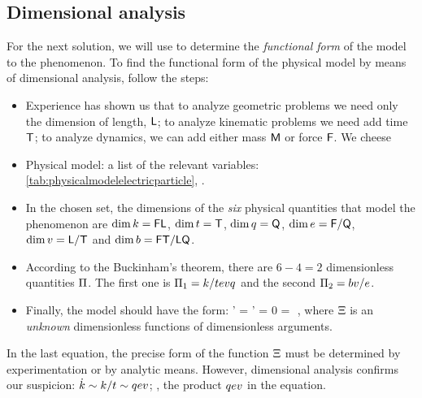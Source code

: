 \subsection{Dimensional analysis}\label{sec:dimanalysis}
%
For the next solution, we will use  to determine the \emph{functional form} of the model to the phenomenon. To find the functional form of the physical model by means of dimensional analysis, follow the steps:
%
\begin{itemize}
%
%
\item Experience has shown us that to analyze geometric problems we need only the dimension of length, $\mathsf{L}$; to analyze kinematic problems we need add time $\mathsf{T}$; to analyze dynamics, we can add either mass $\mathsf{M}$ or force $\mathsf{F}$. We cheese
%
\item Physical model: a list of the relevant variables: \vide \cref{tab:physicalmodelelectricparticle}, \cite[p. 4]{price:2006}.
%
~
%
\item In the chosen set, the dimensions of the \emph{six} physical quantities that model the phenomenon are $\dim k = \mathsf{FL}$, $\dim t = \mathsf{T}$, $\dim q = \mathsf{Q}$, $\dim e = \mathsf{F}/\mathsf{Q}$, $\dim v = \mathsf{L}/\mathsf{T}$ and $\dim b = \mathsf{F}\mathsf{T}/\mathsf{L}\mathsf{Q}$.
%
~
%
\item According to the Buckinham's theorem, there are $6 - 4 = 2$ dimensionless quantities $\Pi$. The first one is $\Pi_1 = k/tevq$ and the second $\Pi_2 = bv/e$.
%
\item Finally, the model should have the form:
%
\beq
  \fdim' = \fdim' 
                               = 0
                                \implies
   = \efield\vel\echarge\,\fdim\vat{\dfrac{\mfield\vel}{\efield}}\,,
\eeq
%
where $\Xi$ is an \emph{unknown} dimensionless functions of dimensionless arguments.
%
\end{itemize}
%
In the last equation, the precise form of the function $\Xi$ must be determined by experimentation or by analytic means. However, dimensional analysis confirms our suspicion: $\dot{k}\sim k/t\sim qev$; \ie, the product $qev$  in the equation. 

